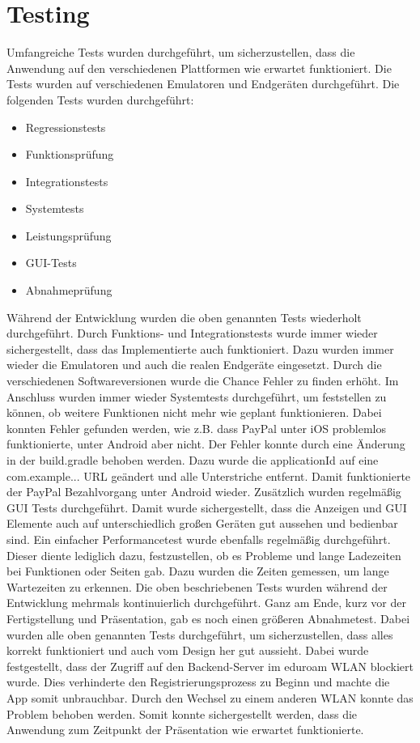 
\chapter{Testing}

Umfangreiche Tests wurden durchgeführt, um sicherzustellen, dass die Anwendung auf den verschiedenen Plattformen wie erwartet funktioniert.
Die Tests wurden auf verschiedenen Emulatoren und Endgeräten durchgeführt.
Die folgenden Tests wurden durchgeführt:

\begin{itemize}
    \item Regressionstests
    \item Funktionsprüfung
    \item Integrationstests
    \item Systemtests
    \item Leistungsprüfung
    \item GUI-Tests
    \item Abnahmeprüfung
\end{itemize}

Während der Entwicklung wurden die oben genannten Tests wiederholt durchgeführt.
Durch Funktions- und Integrationstests wurde immer wieder sichergestellt, dass das Implementierte auch funktioniert.
Dazu wurden immer wieder die Emulatoren und auch die realen Endgeräte eingesetzt.
Durch die verschiedenen Softwareversionen wurde die Chance Fehler zu finden erhöht.
Im Anschluss wurden immer wieder Systemtests durchgeführt, um feststellen zu können, ob weitere Funktionen nicht mehr wie geplant funktionieren.
Dabei konnten Fehler gefunden werden, wie z.B. dass PayPal unter iOS problemlos funktionierte, unter Android aber nicht.
Der Fehler konnte durch eine Änderung in der build.gradle behoben werden.
Dazu wurde die applicationId auf eine com.example... URL geändert und alle Unterstriche entfernt.
Damit funktionierte der PayPal Bezahlvorgang unter Android wieder.
Zusätzlich wurden regelmäßig GUI Tests durchgeführt.
Damit wurde sichergestellt, dass die Anzeigen und GUI Elemente auch auf unterschiedlich großen Geräten gut aussehen und bedienbar sind.
Ein einfacher Performancetest wurde ebenfalls regelmäßig durchgeführt.
Dieser diente lediglich dazu, festzustellen, ob es Probleme und lange Ladezeiten bei Funktionen oder Seiten gab.
Dazu wurden die Zeiten gemessen, um lange Wartezeiten zu erkennen.
Die oben beschriebenen Tests wurden während der Entwicklung mehrmals kontinuierlich durchgeführt.
Ganz am Ende, kurz vor der Fertigstellung und Präsentation, gab es noch einen größeren Abnahmetest.
Dabei wurden alle oben genannten Tests durchgeführt, um sicherzustellen, dass alles korrekt funktioniert und auch vom Design her gut aussieht.
Dabei wurde festgestellt, dass der Zugriff auf den Backend-Server im \glqq eduroam\grq{} WLAN blockiert wurde.
Dies verhinderte den Registrierungsprozess zu Beginn und machte die App somit unbrauchbar.
Durch den Wechsel zu einem anderen WLAN konnte das Problem behoben werden.
Somit konnte sichergestellt werden, dass die Anwendung zum Zeitpunkt der Präsentation wie erwartet funktionierte.
